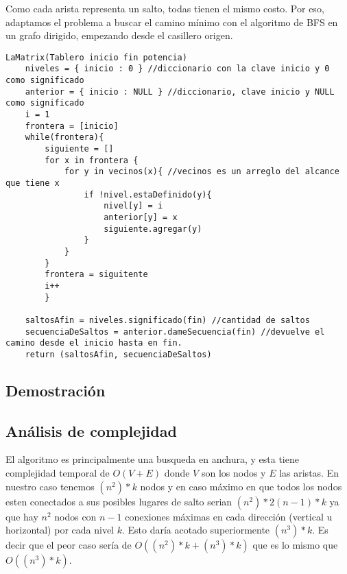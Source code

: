 Como cada arista representa un salto, todas tienen el mismo costo. Por eso, adaptamos el problema a buscar el camino m\'inimo con el algoritmo de BFS en un grafo dirigido, empezando desde el casillero origen.

\begin{verbatim}
LaMatrix(Tablero inicio fin potencia)
    niveles = { inicio : 0 } //diccionario con la clave inicio y 0 como significado
    anterior = { inicio : NULL } //diccionario, clave inicio y NULL como significado
    i = 1
    frontera = [inicio]
    while(frontera){
        siguiente = []
        for x in frontera {
            for y in vecinos(x){ //vecinos es un arreglo del alcance que tiene x
                if !nivel.estaDefinido(y){
                    nivel[y] = i
                    anterior[y] = x
                    siguiente.agregar(y)
                }
            }
        }
        frontera = siguitente
        i++
        }

    saltosAfin = niveles.significado(fin) //cantidad de saltos
    secuenciaDeSaltos = anterior.dameSecuencia(fin) //devuelve el camino desde el inicio hasta en fin.
    return (saltosAfin, secuenciaDeSaltos)
\end{verbatim}


\subsection{Demostraci\'on} 

\subsection{An\'alisis de complejidad}

El algoritmo es principalmente una busqueda en anchura, y esta tiene complejidad temporal de $O(V + E)$ donde $V$ son los nodos y $E$ las aristas.
En nuestro caso tenemos $(n^2)*k$ nodos y en caso m\'aximo en que todos los nodos esten conectados a sus posibles lugares de salto serian $(n^2)*2(n-1)*k$ ya que hay $n^2$ nodos con $n-1$ conexiones m\'aximas en cada direcci\'on (vertical u horizontal) por cada nivel $k$. Esto dar\'ia acotado superiormente $(n^3)*k$.
Es decir que el peor caso ser\'ia de $O((n^2)*k + (n^3)*k)$ que es lo mismo que $O((n^3)*k)$.

















